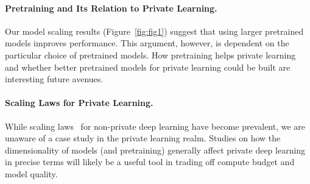 \paragraph{Pretraining and Its Relation to Private Learning.}
Our model scaling results (Figure~\ref{fig:fig1}) suggest that using larger pretrained models improves performance. 
This argument, however, is dependent on the particular choice of pretrained models.
How pretraining helps private learning and whether better pretrained models for private learning could be built are interesting future avenues.

\paragraph{Scaling Laws for Private Learning.}
While scaling laws~\citep{kaplan2020scaling} for non-private deep learning have become prevalent, we are unaware of a case study in the private learning realm. 
Studies on how the dimensionality of models (and pretraining) generally affect private deep learning in precise terms will likely be a useful tool in trading off compute budget and model quality.
